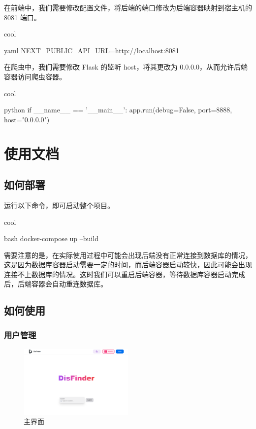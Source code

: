 在前端中，我们需要修改配置文件，将后端的端口修改为后端容器映射到宿主机的 8081 端口。

\begin{codebox}{}{cool}
\begin{amzcode}{yaml}
NEXT_PUBLIC_API_URL=http://localhost:8081
\end{amzcode}
\end{codebox}

在爬虫中，我们需要修改 Flask 的监听 host，将其更改为 0.0.0.0，从而允许后端容器访问爬虫容器。

\begin{codebox}{}{cool}
\begin{amzcode}{python}
if __name__ == '__main__':
    app.run(debug=False, port=8888, host="0.0.0.0")
\end{amzcode}
\end{codebox}

\chapter{使用文档}

\section{如何部署}

运行以下命令，即可启动整个项目。

\begin{codebox}{}{cool}
\begin{amzcode}{bash}
docker-compose up --build
\end{amzcode}
\end{codebox}

需要注意的是，在实际使用过程中可能会出现后端没有正常连接到数据库的情况，这是因为数据库容器启动需要一定的时间，而后端容器启动较快，因此可能会出现连接不上数据库的情况。这时我们可以重启后端容器，等待数据库容器启动完成后，后端容器会自动重连数据库。

\section{如何使用}

\subsection{用户管理}

\begin{figure}[H]
\centering
\includegraphics[width=0.5\textwidth]{assets/report/homepage.png}
\caption{主界面}
\end{figure}

